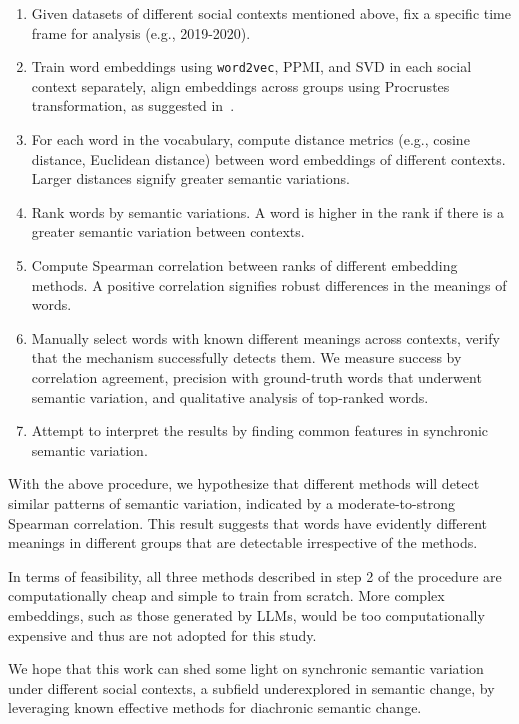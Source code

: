 \documentclass[conference]{IEEEtran}
\begin{document}
\begin{enumerate}
    \item Given datasets of different social contexts mentioned above, fix a specific time frame for analysis (e.g., 2019-2020).
    \item Train word embeddings using \texttt{word2vec}, PPMI, and SVD in each social context separately, align embeddings across groups using Procrustes transformation, as suggested in~\cite{hamilton2016diachronic}.
    \item For each word in the vocabulary, compute distance metrics (e.g., cosine distance, Euclidean distance) between word embeddings of different contexts. Larger distances signify greater semantic variations.
    \item Rank words by semantic variations. A word is higher in the rank if there is a greater semantic variation between contexts.
    \item Compute Spearman correlation between ranks of different embedding methods. A positive correlation signifies robust differences in the meanings of words.
    \item Manually select words with known different meanings across contexts, verify that the mechanism successfully detects them. We measure success by correlation agreement, precision with ground-truth words that underwent semantic variation, and qualitative analysis of top-ranked words.
    \item Attempt to interpret the results by finding common features in synchronic semantic variation.
\end{enumerate}

With the above procedure, we hypothesize that different methods will detect similar patterns of semantic variation, indicated by a moderate-to-strong Spearman correlation. This result suggests that words have evidently different meanings in different groups that are detectable irrespective of the methods.

In terms of feasibility, all three methods described in step 2 of the procedure are computationally cheap and simple to train from scratch. More complex embeddings, such as those generated by LLMs, would be too computationally expensive and thus are not adopted for this study.

We hope that this work can shed some light on synchronic semantic variation under different social contexts, a subfield underexplored in semantic change, by leveraging known effective methods for diachronic semantic change.



\end{document}

